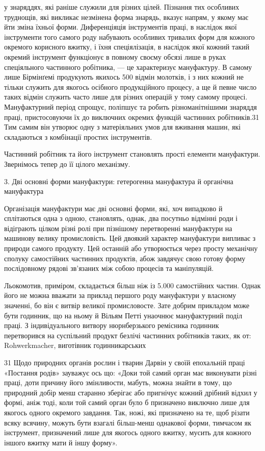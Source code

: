 у знаряддях, які раніше служили для різних цілей. Пізнання
тих особливих труднощів, які викликає незмінена форма знарядь,
вказує напрям, у якому має йти зміна їхньої форми. Диференціяція
інструментів праці, в наслідок якої інструменти того самого роду
набувають особливих тривалих форм для кожного окремого
корисного вжитку, і їхня спеціялізація, в наслідок якої кожний
такий окремий інструмент функціонує в повному своєму обсязі
лише в руках спеціяльного частинного робітника, — це характеризує мануфактуру. В самому лише
Бірмінґемі продукують
якихось 500 відмін молотків, і з них кожний не тільки служить
для якогось осібного продукційного процесу, а ще й певне число
таких відмін служить часто лише для різних операцій у тому
самому процесі. Мануфактурний період спрощує, поліпшує та
робить різноманітнішими знаряддя праці, пристосовуючи їх до
виключних окремих функцій частинних робітників.31 Тим самим
він утворює одну з матеріяльних умов для вживання машин,
які складаються з комбінації простих інструментів.

Частинний робітник та його інструмент становлять прості
елементи мануфактури. Звернімось тепер до її цілого механізму.

3. Дві основні форми мануфактури: гетерогенна мануфактура
й органічна мануфактура

Організація мануфактури має дві основні форми, які, хоч
випадково й сплітаються одна з одною, становлять, однак, два
посутньо відмінні роди і відіграють цілком різні ролі при пізнішому перетворенні мануфактури на
машинову велику промисловість. Цей двоякий характер мануфактури випливає з природи самого продукту.
Цей останній або утворюється через просту
механічну сполуку самостійних частинних продуктів, абож
завдячує свою готову форму послідовному рядові зв’язаних між
собою процесів та маніпуляцій.

Льокомотив, приміром, складається більш ніж із 5.000 самостійних частин. Однак його не можна вважати
за приклад першого роду мануфактури у власному значенні, бо він є витвір великої промисловосте. Зате
добрим прикладом може бути годинник,
що на ньому й Вільям Петті унаочнює мануфактурний поділ праці. З індивідуального витвору
нюрнберзького ремісника годинник перетворився на суспільний продукт безлічі частинних робітників
таких, як от: Rohwerkmacher, виготівник годинникарських

31 Щодо природних органів рослин і тварин Дарвін у своїй епохальній праці «Постання родів» зауважує
ось що: «Доки той самий орган має виконувати різні праці, доти причину його змінливости, мабуть,
можна знайти в тому, що природний добір менш старанно зберігає або пригнічує кожний дрібний відхил у
формі, аніж тоді, коли той самий орган було б призначено виключно лише для якогось одного окремого
завдання. Так, ножі, які призначено на те, щоб різати всяку всячину,
можуть бути взагалі більш-менш однакової форми, тимчасом як інструмент, призначений лише для якогось
одного вжитку, мусить для кожного
іншого вжитку мати й іншу форму».
